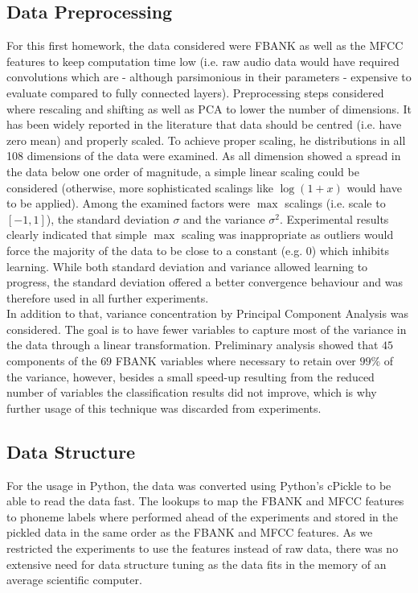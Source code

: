 \documentclass[]{article}
\begin{document}
\subsection{Data Preprocessing}
For this first homework, the data considered were FBANK as well as the MFCC features to keep computation time low (i.e. raw audio data would have required convolutions which are - although parsimonious in their parameters - expensive to evaluate compared to fully connected layers). Preprocessing steps considered where rescaling and shifting as well as PCA to lower the number of dimensions. It has been widely reported in the literature that data should be centred (i.e. have zero mean) and properly scaled. To achieve proper scaling, he distributions in all 108 dimensions of the data were examined. As all dimension showed a spread in the data below one order of magnitude, a simple linear scaling could be considered (otherwise, more sophisticated scalings like $\log(1+x)$ would have to be applied). Among the examined factors were $\max$ scalings (i.e. scale to $[-1,1]$), the standard deviation $\sigma$ and the variance $\sigma^2$. Experimental results clearly indicated that simple $\max$ scaling was inappropriate as outliers would force the majority of the data to be close to a constant (e.g. 0) which inhibits learning. While both standard deviation and variance allowed learning to progress, the standard deviation offered a better convergence behaviour and was therefore used in all further experiments.\\
In addition to that, variance concentration by Principal Component Analysis was considered. The goal is to have fewer variables to capture most of the variance in the data through a linear transformation. Preliminary analysis showed that $45$ components of the $69$ FBANK variables where necessary to retain over $99\%$ of the variance, however, besides a small speed-up resulting from the reduced number of variables the classification results did not improve, which is why further usage of this technique was discarded from experiments.
\subsection{Data Structure}
For the usage in Python, the data was converted using Python's cPickle to be able to read the data fast. The lookups to map the FBANK and MFCC features to phoneme labels where performed ahead of the experiments and stored in the pickled data in the same order as the FBANK and MFCC features. As we restricted the experiments to use the features instead of raw data, there was no extensive need for data structure tuning as the data fits in the memory of an average scientific computer.
\end{document}
